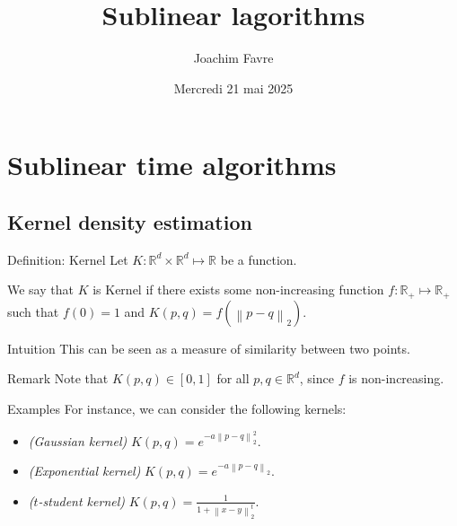 \documentclass[a4paper]{article}
\title{Sublinear lagorithms}
\author{Joachim Favre}
\date{Mercredi 21 mai 2025}
\begin{document}
\maketitle


\section{Sublinear time algorithms}
\subsection{Kernel density estimation}

\begin{parag}{Definition: Kernel}
    Let $K: \mathbb{R}^d \times \mathbb{R}^d \mapsto \mathbb{R}$ be a function.

    We say that $K$ is Kernel if there exists some non-increasing function $f: \mathbb{R}_+ \mapsto \mathbb{R}_+$ such that $f\left(0\right) = 1$ and $K\left(p, q\right) = f\left(\left\|p - q\right\|_2\right)$. 

    \begin{subparag}{Intuition}
        This can be seen as a measure of similarity between two points.
    \end{subparag}

    \begin{subparag}{Remark}
        Note that $K\left(p, q\right) \in \left[0, 1\right]$ for all $p, q \in \mathbb{R}^d$, since $f$ is non-increasing.
    \end{subparag}

    \begin{subparag}{Examples}
        For instance, we can consider the following kernels:
        \begin{itemize}
            \item \textit{(Gaussian kernel)} $\displaystyle K\left(p, q\right) = e^{-a \left\|p - q\right\|_2^2}$.
            \item \textit{(Exponential kernel)} $\displaystyle K\left(p, q\right) = e^{-a \left\|p - q\right\|_2}$.
            \item \textit{($t$-student kernel)} $\displaystyle K\left(p, q\right) = \frac{1}{1 + \left\|x- y\right\|_2^t}$.
        \end{itemize}
    \end{subparag}
\end{parag}
\end{document}
